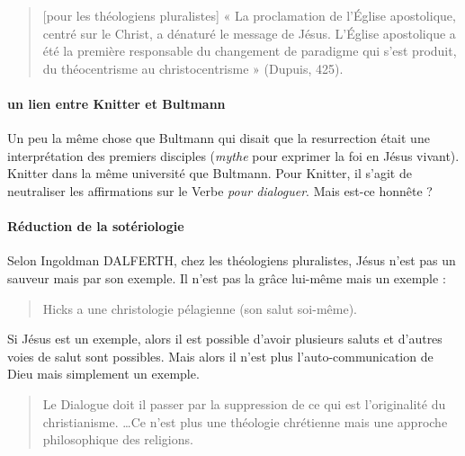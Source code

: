 \begin{quote}
    [pour les théologiens pluralistes] « La proclamation de l’Église apostolique, centré sur le Christ, a dénaturé le message de Jésus. L’Église apostolique a été la première responsable du changement de paradigme qui s’est produit, du théocentrisme au christocentrisme » (Dupuis, 425). 
\end{quote}

\paragraph{un lien entre Knitter et Bultmann}
Un peu la même chose que Bultmann qui disait que la resurrection était une interprétation des premiers disciples (\textit{mythe} pour exprimer la foi en Jésus vivant). Knitter dans la même université que Bultmann.
Pour Knitter, il s'agit de neutraliser les affirmations sur le Verbe \textit{pour dialoguer}. Mais est-ce honnête ? 


\paragraph{Réduction de la sotériologie} Selon Ingoldman DALFERTH, chez les théologiens pluralistes, Jésus n'est pas un sauveur mais par son exemple. Il n'est pas la grâce lui-même mais un exemple : 

\begin{quote}
    Hicks a une christologie pélagienne (son salut soi-même). 
\end{quote}

Si Jésus est un exemple, alors il est possible d'avoir plusieurs saluts et d'autres voies de salut sont possibles.
Mais alors il n'est plus l'auto-communication de Dieu mais simplement un exemple. 
\begin{quote}
    Le Dialogue doit il passer par la suppression de ce qui est l'originalité du christianisme. 
    \ldots Ce n'est plus une théologie chrétienne mais une approche philosophique des religions. 
\end{quote}

